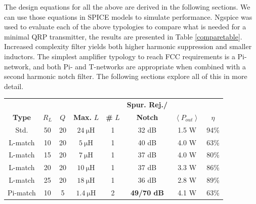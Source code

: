 \documentclass[10pt,letterpaper]{article}
\begin{document}
The design equations for all the above are derived in the following sections. We can use those equations in SPICE models to simulate performance. Ngspice was used to evaluate each of the above typologies to compare what is needed for a minimal QRP transmitter, the results are presented in Table \ref{comparetable}. Increased complexity filter yields both higher harmonic suppression and smaller inductors. The simplest amplifier typology to reach FCC requirements is a Pi-network, and both Pi- and T-networks are appropriate when combined with a second harmonic notch filter. The following sections explore all of this in more detail.




\begin{table}
\centering
\begin{tabular}{ccc|ccccc}
 &  & &  &  & \textbf{Spur. Rej./} & &  \\
\textbf{Type} & $R_L$ &$Q$ & \textbf{Max.} $L$ & \textbf{\#} $L$ & \textbf{Notch} & $\left\langle P_{out}\right\rangle$ & $\eta$ \\
\hline
\hline 
Std. & 50 & 20 & $\SI{24}{\micro\henry}$ & 1 & 32 dB & 1.5 W & 94\%\\ \hline 
L-match & 10 & 20 & $\SI{5}{\micro\henry}$ & 1 & 40 dB & 4.0 W & 63\%\\ \hline 
L-match & 15 & 20 & $\SI{7}{\micro\henry}$ & 1 & 37 dB & 4.0 W & 80\%\\ \hline 
L-match & 20 & 20 & $\SI{10}{\micro\henry}$ & 1 & 37 dB & 3.3 W & 86\%\\ \hline 
L-match & 25 & 20 & $\SI{18}{\micro\henry}$ & 1 & 36 dB & 2.8 W & 89\%\\ \hline 
Pi-match & 10 & 5 & $\SI{1.4}{\micro\henry}$ & 2 & \textbf{49/70 dB} & 4.1 W & 63\%\\ \hline 

\end{tabular}
\end{table}
\end{document}
